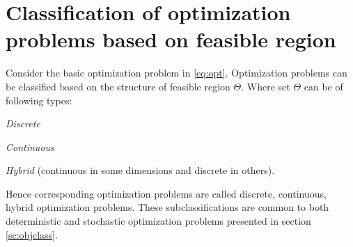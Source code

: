 \section{Classification of optimization problems based on feasible region}
Consider the basic optimization problem in \eqref{eq:opt}. Optimization problems can be classified based on the structure of feasible region $\Theta$. Where set $\Theta$ can be of following types:

\begin{inparaenum}[\bfseries (i)]
 \item \emph{Discrete}
\item \emph{Continuous}
\item \emph{Hybrid} (continuous in some dimensions and discrete in others).
\end{inparaenum}
Hence corresponding optimization problems are called discrete, continuous, hybrid optimization problems. These subclassifications are common to both deterministic and stochastic optimization problems presented in section \ref{sc:objclass}. 

